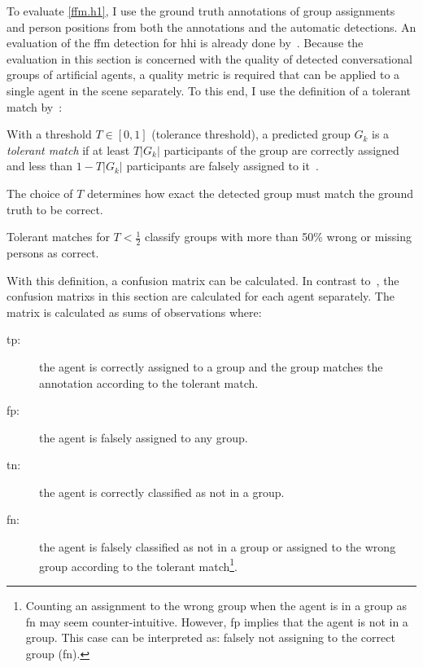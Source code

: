 To evaluate \cref{ffm.h1}, I use the ground truth annotations of group assignments and person positions from both the annotations and the automatic detections.
An evaluation of the \gls{ffm} detection for \gls{hhi} is already done by~.
Because the evaluation in this section is concerned with the quality of detected \glspl{conversational group} of \glspl{artificial agent}, a quality metric is required that can be applied to a single agent in the scene separately.
To this end, I use the definition of a \gls{tolerant match} by~:
\begin{definition}
    \label{def.tm}
     With a threshold \(T \in [0,1]\) (\gls{tolerance threshold}), a predicted group \(G_k\) is a \emph{tolerant match} if at least \(T|G_k|\) participants of the group are correctly assigned and less than \(1-T|G_k|\) participants are falsely assigned to it~\cite[]{Setti2015}.
\end{definition}
The choice of \(T\) determines how exact the detected group must match the ground truth to be correct.
\begin{corollary}
    \label{cor.tm.1}
    Tolerant matches for \(T < \frac{1}{2}\) classify groups with more than 50\% wrong or missing persons as correct.
\end{corollary}
With this definition, a \gls{confusion matrix} can be calculated.
In contrast to~, the \glspl{confusion matrix} in this section are calculated for each agent separately.
The matrix is calculated as sums of observations where:
\begin{description}
    \item[\acrshort{tp}:] the agent is correctly assigned to a group and the group mat\-ches the annotation according to the \gls{tolerant match}.
    \item[\acrshort{fp}:] the agent is falsely assigned to any group.
    \item[\acrshort{tn}:] the agent is correctly classified as not in a group.
    \item[\acrshort{fn}:] the agent is falsely classified as not in a group or assigned to the wrong group according to the \gls{tolerant match}\footnote{Counting an assignment to the wrong group when the agent is in a group as \acrlong{fn} may seem counter-intuitive.
    However, \acrlong{fp} implies that the agent is not in a group.
    This case can be interpreted as: falsely not assigning to the correct group (\acrlong{fn}).
    }.
\end{description}
